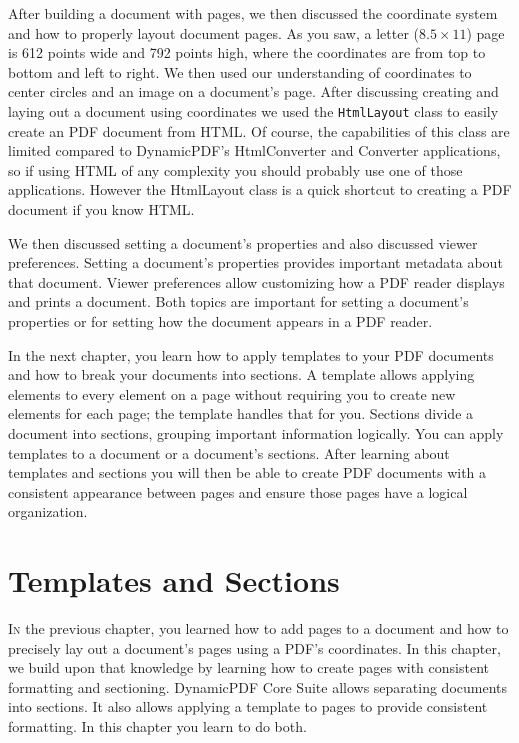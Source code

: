 \documentclass[american,letterpaper]{tufte-book}
\numberwithin{equation}{section}
\numberwithin{figure}{section}
\def\color#1{}%
\begin{document}
After building a document with pages, we then discussed the coordinate
system and how to properly layout document pages. As you saw, a letter ($8.5\times11$) page is 612 points wide and
792 points high, where the coordinates are from top to bottom and
left to right.
We then used our understanding of coordinates to center circles and
an image on a document's page. After discussing creating and laying
out a document using coordinates we used the \texttt{HtmlLayout} class
to easily create an PDF document from HTML. Of course, the capabilities
of this class are limited compared to DynamicPDF's HtmlConverter and
Converter applications, so if using HTML of any complexity you should
probably use one of those applications. However the HtmlLayout class
is a quick shortcut to creating a PDF document if you know HTML.

We then discussed setting a document's properties and also discussed viewer preferences. Setting a document’s properties provides
important metadata about that document. Viewer preferences allow customizing
how a PDF reader displays and prints a document. Both topics are
important for setting a document's properties or for setting how the
document appears in a PDF reader.

In the next chapter, you learn how to apply templates to your
PDF documents and how to break your documents into sections. A template
allows applying elements to every element on a page without requiring you to create new elements for each page; the template handles that for you. Sections divide a document into sections, grouping important information logically.
You can apply templates to a document or a document’s
sections. After learning about templates and sections you will then be
able to create PDF documents with a consistent appearance between
pages and ensure those pages have a logical organization.

\color{white}
\chapter{Templates and Sections}\label{chap:Templates-and-Document}
\color{black}
\BgThispage
\vspace{8.0em}
\lettrine[lines=2,lhang=0.1]{I}{n} the previous chapter, you learned how to add pages to a document and how to precisely lay out a document's
pages using a PDF's coordinates. In this chapter, we build upon that
knowledge by learning how to create pages with consistent formatting
and sectioning. DynamicPDF Core Suite allows separating documents
into sections. It also allows applying a template to pages to provide
consistent formatting. In this chapter you learn to do both.
\end{document}

